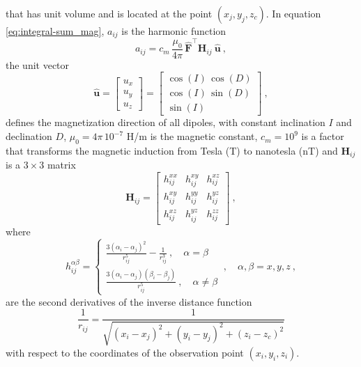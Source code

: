 \documentclass[manuscript]{geophysics}
\begin{document}
that has unit volume and is located at the point $(x_{j}, y_{j}, z_{c})$. In equation
\ref{eq:integral-sum_mag}, $a_{ij}$ is the harmonic function
\begin{equation}
	a_{ij}
	= c_{m} \, \frac{\mu_{0}}{4\pi} \, \hat{\mathbf{F}}^{\top} \mathbf{H}_{ij} \: \hat{\mathbf{u}} \: ,
	\label{eq:aij_mag}
\end{equation}
the unit vector
\begin{equation}
	\hat{\mathbf{u}} = \begin{bmatrix}
		u_x \\
		u_y \\
		u_z
	\end{bmatrix} =
	\begin{bmatrix}
		\cos(I) \, \cos(D) \\
		\cos(I) \, \sin(D) \\
		\sin(I)
	\end{bmatrix} \: ,
	\label{eq:u_hat}
\end{equation}
defines the magnetization direction of all dipoles, with constant inclination $I$ and declination $D$,
$\mu_{0} = 4\pi \, 10^{-7}$ H/m is the magnetic constant, $c_{m} = 10^{9}$ is a factor that transforms
the magnetic induction from Tesla (T) to nanotesla (nT) and $\mathbf{H}_{ij}$ is a $3 \times 3$ matrix 
\begin{equation}
	\mathbf{H}_{ij} = \begin{bmatrix}
		h^{xx}_{ij} & h^{xy}_{ij} & h^{xz}_{ij} \\
		h^{xy}_{ij} & h^{yy}_{ij} & h^{yz}_{ij} \\
		h^{xz}_{ij} & h^{yz}_{ij} & h^{zz}_{ij}
	\end{bmatrix} \: ,
	\label{eq:Hij}
\end{equation}
where 
\begin{equation}
	h^{\alpha\beta}_{ij} = 
	\begin{cases}
		\frac{3 \left( \alpha_{i} - \alpha_{j} \right)^{2}}{r_{ij}^{5}} - \frac{1}{r_{ij}^{3}} \: , \quad \alpha = \beta \\
		\frac{3 \left( \alpha_{i} - \alpha_{j} \right) \left( \beta_{i} - \beta_{j} \right)}{r_{ij}^{5}} \: , \quad \alpha \ne \beta
	\end{cases} \: , \quad \alpha, \beta = x, y, z \: ,
	\label{eq:hij_alpha_beta}
\end{equation}
are the second derivatives of the inverse distance function
\begin{equation}
	\frac{1}{r_{ij}} = 
	\frac{1}{\sqrt{\left(x_{i} - x_{j} \right)^{2} + 
			\left(y_{i} - y_{j} \right)^{2} + \left(z_{i} - z_{c} \right)^{2}}}
	\label{eq:1_rij}
\end{equation}
with respect to the coordinates of the observation point $(x_{i}, y_{i}, z_{i})$.
\end{document}
